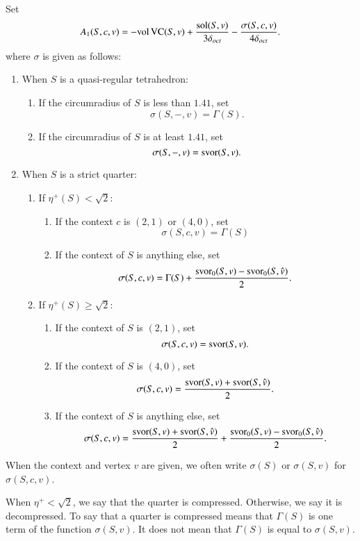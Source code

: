 \begin{definition}\label{def:sigma}
Set
   \begin{equation}\label{eqn:a1-sigma}
   A_1(S,c,v) = -{\operatorname{vol}}\,{\operatorname{VC}}(S,v)+
      \frac{\operatorname{sol}(S,v)}{3\delta_{oct}} - \frac{\sigma(S,c,v)}{4\delta_{oct}}.
      \end{equation}  where $\sigma$ is given as follows:
\begin{enumerate}
\item When $S$ is a quasi-regular tetrahedron:
   \begin{enumerate}
      \item If the circumradius of $S$ is less than $1.41$, set
         $$\sigma(S,-,v)=\Gamma(S).$$
      \item If the circumradius of $S$ is at least $1.41$, set
         $$\sigma(S,-,v)=\operatorname{svor}(S,v).$$
   \end{enumerate}
\item When $S$ is a strict quarter:
   \begin{enumerate}
      \item If $\eta^+(S) <\sqrt2$:
         \begin{enumerate}
         \item If the context $c$ is $(2,1)$ or $(4,0)$, set
                  $$\sigma(S,c,v)=\Gamma(S)$$
         \item If the context of $S$ is anything else, set
                  $$\sigma(S,c,v)=\Gamma(S) +
                     \frac{\operatorname{svor}_0(S,v)-\operatorname{svor}_0(S,\hat v)}{2}.$$
         \end{enumerate}
      \item If $\eta^+(S) \ge\sqrt2$:
         \begin{enumerate}
         \item If the context of $S$ is $(2,1)$, set
                  $$\sigma(S,c,v)=\operatorname{svor}(S,v).$$
         \item If the context of $S$ is $(4,0)$, set
                  $$\sigma(S,c,v)=\frac{\operatorname{svor}(S,v)+\operatorname{svor}(S,\hat v)}{2}.$$
         \item If the context of $S$ is anything else, set
                  $$\sigma(S,c,v)=\frac{\operatorname{svor}(S,v)+\operatorname{svor}(S,\hat
                  v)}{2}
                     +\frac{\operatorname{svor}_0(S,v)-\operatorname{svor}_0(S,\hat v)}{2}.$$
         \end{enumerate}
   \end{enumerate}
\end{enumerate}
When the context and vertex $v$ are given, we often write
$\sigma(S)$ or $\sigma(S,v)$ for $\sigma(S,c,v)$.

When $\eta^+<\sqrt2$, we say that the quarter is compressed.
Otherwise, we say it is decompressed.  To say that a quarter is
compressed means that $\Gamma(S)$ is one term of the function
$\sigma(S,v)$. It does not mean that $\Gamma(S)$ is equal to
$\sigma(S,v)$.
%
\end{definition}

